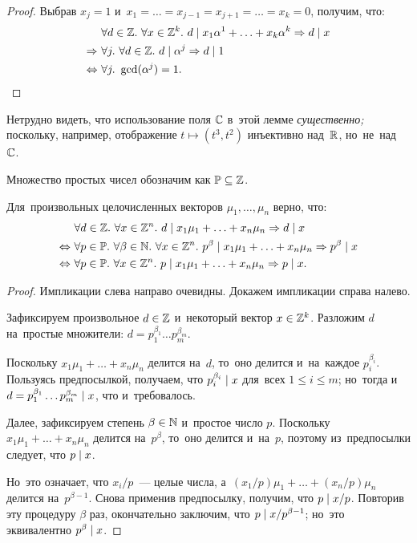 \documentclass[a4paper,oneside]{article}
\begin{document}
\begin{proof}
  Выбрав $x_j = 1$ и~$x_1 = \ldots = x_{j - 1} = x_{j + 1} = \ldots = x_k = 0$, получим, что:
  \[
  \begin{aligned}[b]
                     & \forall d \in \mathbb{Z}.\ \forall x \in \mathbb{Z}^k.\ d \mid x_1 \alpha^1 + \ldots + x_k \alpha^k \Rightarrow d \mid x \\
        \Rightarrow\ & \forall j.\ \forall d \in \mathbb{Z}.\ d \mid \alpha^j \Rightarrow d \mid 1 \\
    \Leftrightarrow\ & \forall j.\ \gcd(\alpha^j) = 1.
  \end{aligned}
  \qedhere
  \]
\end{proof}

Нетрудно видеть, что использование поля $\mathbb{C}$ в~этой лемме \textit{существенно;} поскольку, например,
отображение $t \mapsto (t^3, t^2)$ инъективно над~$\mathbb{R}$, но~не~над~$\mathbb{C}$.

Множество простых чисел обозначим как $\mathbb{P} \subseteq \mathbb{Z}$.

\begin{lemma*}
  Для~произвольных целочисленных векторов $\mu_1, \ldots, \mu_n$ верно, что:
  \[
  \begin{aligned}
                     & \forall d \in \Z.\ \forall x \in \Z^n.\ d \divides x_1 \mu_1 + \ldots + x_n \mu_n \Rightarrow d \divides x \\
    \Leftrightarrow\ & \forall p \in \primes.\ \forall \beta \in \N.\ \forall x \in \Z^n.\ p^\beta \divides x_1 \mu_1 + \ldots + x_n \mu_n \Rightarrow p^\beta \divides x \\
    \Leftrightarrow\ & \forall p \in \primes.\ \forall x \in \Z^n.\ p \divides x_1 \mu_1 + \ldots + x_n \mu_n \Rightarrow p \divides x.
  \end{aligned}
  \]
\end{lemma*}

\begin{proof}
  Импликации слева направо очевидны. Докажем импликации справа налево.

  Зафиксируем произвольное $d \in \mathbb{Z}$ и~некоторый вектор $x \in \mathbb{Z}^k$.
  Разложим $d$ на~простые множители: $d = p_1^{\beta_1} \ldots p_m^{\beta_m}$.

  Поскольку $x_1 \mu_1 + \ldots + x_n \mu_n$ делится на~$d$, то~оно делится и~на~каждое $p_i^{\beta_i}$.
  Пользуясь предпосылкой, получаем, что $p_i^{\beta_i} \mid x$ для~всех $1 \leq i \leq m$;
  но~тогда и~$d = p_1^{\beta_1} \ldots p_m^{\beta_m} \mid x$, что и~требовалось.

  Далее, зафиксируем степень $\beta \in \mathbb{N}$ и~простое число $p$.
  Поскольку $x_1 \mu_1 + \ldots + x_n \mu_n$ делится на~$p^\beta$,
  то~оно делится и~на~$p$, поэтому из~предпосылки следует, что $p \mid x$.

  Но~это означает, что $x_i / p$~— целые числа, а~$(x_1 / p) \mu_1 + \ldots + (x_n / p) \mu_n$ делится на~$p^{\beta - 1}$.
  Снова применив предпосылку, получим, что $p \mid x / p$.
  Повторив эту процедуру $\beta$ раз, окончательно заключим, что $p \mid x / p^{\beta - 1}$;
  но~это эквивалентно $p^\beta \mid x$.
\end{proof}
\end{document}
